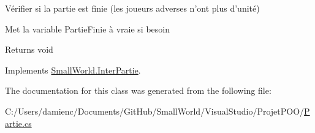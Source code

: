Vérifier si la partie est finie (les joueurs adverses n'ont plus d'unité) 

Met la variable Partie\-Finie à vraie si besoin

\begin{DoxyReturn}{Returns}
void 
\end{DoxyReturn}


Implements \hyperlink{interface_small_world_1_1_inter_partie_abefef771c059be341130c37dc98876b5}{Small\-World.\-Inter\-Partie}.



The documentation for this class was generated from the following file\-:\begin{DoxyCompactItemize}
\item 
C\-:/\-Users/damienc/\-Documents/\-Git\-Hub/\-Small\-World/\-Visual\-Studio/\-Projet\-P\-O\-O/\hyperlink{_partie_8cs}{Partie.\-cs}\end{DoxyCompactItemize}

